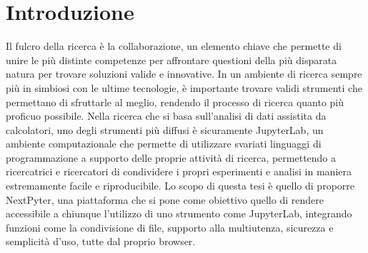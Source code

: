 \chapter{Introduzione}
Il fulcro della ricerca è la collaborazione, un elemento chiave che permette di unire le più distinte competenze per affrontare questioni della più disparata natura per trovare soluzioni valide e innovative. In un ambiente di ricerca sempre più in simbiosi con le ultime tecnologie, è importante trovare validi strumenti che permettano di sfruttarle al meglio, rendendo il processo di ricerca quanto più proficuo possibile.
\newline
\newline
Nella ricerca che si basa sull’analisi di dati assistita da calcolatori, uno degli strumenti più diffusi è sicuramente JupyterLab, un ambiente computazionale che permette di utilizzare svariati linguaggi di programmazione a supporto delle proprie attività di ricerca, permettendo a ricercatrici e ricercatori di condividere i propri esperimenti e analisi in maniera estremamente facile e riproducibile.
\newline
Lo scopo di questa tesi è quello di proporre NextPyter, una piattaforma che si pone come obiettivo quello di rendere accessibile a chiunque l’utilizzo di uno strumento come JupyterLab, integrando funzioni come la condivisione di file, supporto alla multiutenza, sicurezza e semplicità d’uso, tutte dal proprio browser.
\newline
